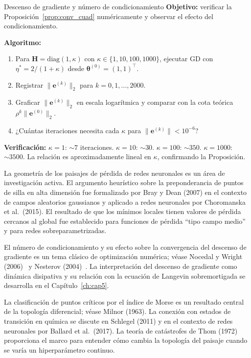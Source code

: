 \begin{ejerciciocomp}{Descenso de gradiente y número de condicionamiento}
\label{ejcomp:condicionamiento}
\textbf{Objetivo:} verificar la Proposición~\ref{prop:conv_cuad}
numéricamente y observar el efecto del condicionamiento.

\medskip\noindent\textbf{Algoritmo:}
\begin{enumerate}
  \item Para $\bm{H} = \text{diag}(1, \kappa)$ con
        $\kappa \in \{1, 10, 100, 1000\}$, ejecutar GD con
        $\eta^* = 2/(1+\kappa)$ desde $\bm{\theta}^{(0)} = (1,1)^\top$.
  \item Registrar $\|\bm{e}^{(k)}\|_2$ para $k = 0, 1, \ldots, 2000$.
  \item Graficar $\|\bm{e}^{(k)}\|_2$ en escala logarítmica y
        comparar con la cota teórica $\rho^k\|\bm{e}^{(0)}\|_2$.
  \item ¿Cuántas iteraciones necesita cada $\kappa$ para
        $\|\bm{e}^{(k)}\| < 10^{-6}$?
\end{enumerate}

\medskip\noindent\textbf{Verificación:}
$\kappa = 1$: $\sim 7$ iteraciones. $\kappa = 10$: $\sim 30$.
$\kappa = 100$: $\sim 350$. $\kappa = 1000$: $\sim 3500$.
La relación es aproximadamente lineal en $\kappa$, confirmando la
Proposición.
\end{ejerciciocomp}

\begin{notasbib}
La geometría de los paisajes de pérdida de redes neuronales es un área
de investigación activa. El argumento heurístico sobre la preponderancia
de puntos de silla en alta dimensión fue formalizado por Bray y Dean
(2007) en el contexto de campos aleatorios gaussianos y aplicado a redes
neuronales por Choromanska et al.\ (2015). El resultado de que los
mínimos locales tienen valores de pérdida cercanos al global fue
establecido para funciones de pérdida ``tipo campo medio'' y para redes
sobreparametrizadas.

El número de condicionamiento y su efecto sobre la convergencia del
descenso de gradiente es un tema clásico de optimización numérica;
véase Nocedal y Wright (2006)~\cite{nocedal2006numerical} y Nesterov
(2004)~\cite{nesterov2004introductory}. La interpretación del descenso
de gradiente como dinámica disipativa y su relación con la ecuación de
Langevin sobremortigada se desarrolla en el Capítulo~\ref{ch:cap5}.

La clasificación de puntos críticos por el índice de Morse es un
resultado central de la topología diferencial; véase Milnor (1963).
La conexión con estados de transición en química se discute en
Schlegel (2011) y en el contexto de redes neuronales por Ballard et al.\
(2017). La teoría de catástrofes de Thom (1972) proporciona el marco
para entender cómo cambia la topología del paisaje cuando se varía
un hiperparámetro continuo.
\end{notasbib}


